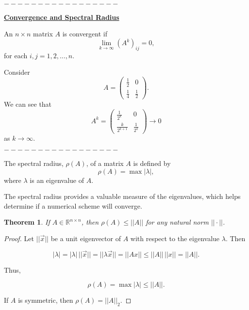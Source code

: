 \documentclass[12pt]{article}
\newcommand{\vecx}{\ensuremath{\vec{x}}}
\newtheorem{theorem}{Theorem}
\newenvironment{definition}[1][Definition]{\begin{trivlist}
\item[\hskip \labelsep {\bfseries #1}]}{\end{trivlist}}
\newenvironment{example}[1][Example]{\begin{trivlist}
\item[\hskip \labelsep {\bfseries #1}]}{\end{trivlist}}
\begin{document}
\begin{center}$-----------------$\end{center}
\vspace*{1em}


\underline{\textbf{Convergence and Spectral Radius}}

\begin{definition}
An $n\times n$ matrix $A$ is convergent if
\[
\lim_{k\rightarrow\infty}(A^k)_{ij} = 0,
\]
for each  $i,j=1,2,...,n$.
\end{definition}

\vspace*{1em}

\begin{example}
Consider 
\[
A = \left(\begin{array}{cc}
\frac{1}{2} & 0 \\ \frac{1}{4} & \frac{1}{2}
\end{array}
\right).
\]
We can see that
\[
A^k =\left(\begin{array}{cc}
 \frac{1}{2^k} & 0 \\ \frac{k}{2^{k+1}} & \frac{1}{2^k}
\end{array}
\right) \rightarrow 0
\]
as $k\rightarrow \infty$.
\end{example}

\begin{center}$-----------------$\end{center}
\vspace*{1em}

\begin{definition}
The spectral radius, $\rho(A)$, of a matrix $A$ is defined by
\[
\rho(A) = \max |\lambda|,
\]
where $\lambda$ is an eigenvalue of $A$. 
\end{definition}

\vspace*{1em}

The spectral radius provides a valuable measure of the eigenvalues, which 
helps determine if a numerical scheme will converge.

\vspace*{1em}

\begin{theorem}
If $A \in \mathbb{R}^{n\times n}$, then $\rho(A)\leq ||A||$ for any natural 
norm $||\cdot||$.
\end{theorem}

\begin{proof}
Let $||\vecx||$ be a unit eigenvector of $A$ with respect to the eigenvalue 
$\lambda$. Then

\[
|\lambda| = |\lambda|\, ||\vecx|| = ||\lambda\vecx|| =
||Ax|| \leq ||A||\, ||x|| = ||A||.
\]

Thus,

\[
\rho(A) = \max|\lambda|\leq ||A||.
\]

If $A$ is symmetric, then $\rho(A) = ||A||_2$.
\end{proof}
\end{document}
